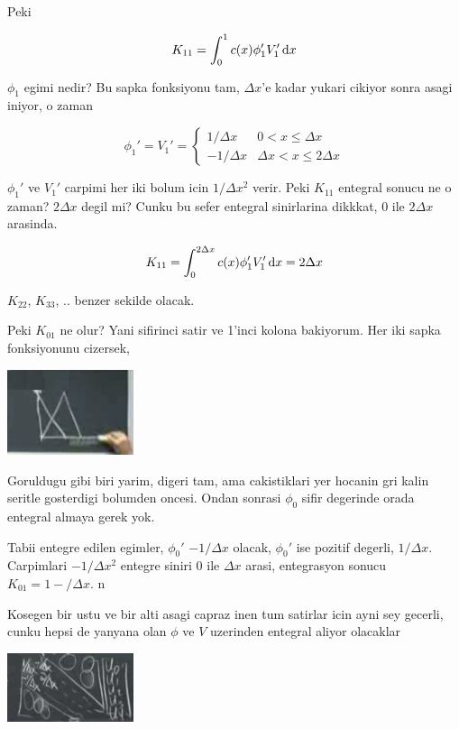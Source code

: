 \documentclass[12pt,fleqn]{article}\usepackage{../../common}
\begin{document}
Peki

$$
K_{11} = \int _{0}^{1} c(x) \phi_1' V_1' \,\mathrm{d} x
$$

$\phi_1$ egimi nedir? Bu sapka fonksiyonu tam, $\Delta x$'e kadar yukari
cikiyor sonra asagi iniyor, o zaman

$$
\phi_1' = V_1' =
\left\{ \begin{array}{rc}
1/\Delta x & 0 < x \le \Delta x \\
-1/\Delta x & \Delta x < x \le 2\Delta x 
\end{array} \right.
$$

$\phi_1'$ ve $V_1'$ carpimi her iki bolum icin $1/\Delta x^2$ verir. Peki
$K_{11}$ entegral sonucu ne o zaman? $2 \Delta x$ degil mi? Cunku bu sefer
entegral sinirlarina dikkkat, 0 ile $2\Delta x$ arasinda. 

$$
K_{11} = \int _{0}^{2\Delta x} c(x) \phi_1' V_1' \,\mathrm{d} x = 2\Delta x
$$

$K_{22}$, $K_{33}$, .. benzer sekilde olacak. 

Peki $K_{01}$ ne olur? Yani sifirinci satir ve 1'inci kolona bakiyorum. Her iki
sapka fonksiyonunu cizersek,

\includegraphics[width=10em]{compscieng_1_18_07.png}

Goruldugu gibi biri yarim, digeri tam, ama cakistiklari yer hocanin gri
kalin seritle gosterdigi bolumden oncesi. Ondan sonrasi $\phi_0$ sifir
degerinde orada entegral almaya gerek yok. 

Tabii entegre edilen egimler, $\phi_0'$ $-1/\Delta x$ olacak, $\phi_0'$ ise
pozitif degerli, $1/\Delta x$. Carpimlari $-1/\Delta x^2$ entegre siniri 0 ile
$\Delta x$ arasi, entegrasyon sonucu $K_{01} = 1-/\Delta x$. n

Kosegen bir ustu ve bir alti asagi capraz inen tum satirlar icin ayni sey
gecerli, cunku hepsi de yanyana olan $\phi$ ve $V$ uzerinden entegral aliyor
olacaklar

\includegraphics[width=10em]{compscieng_1_18_08.png}
\end{document}
